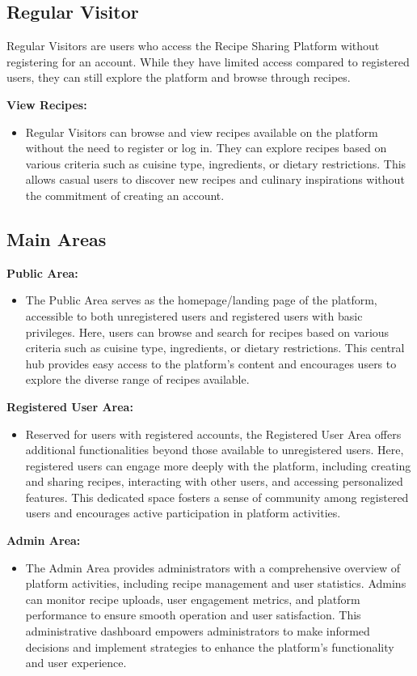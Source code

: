 \subsection{Regular Visitor}

Regular Visitors are users who access the Recipe Sharing Platform without registering for an account. While they have limited access compared to registered users, they can still explore the platform and browse through recipes.

\textbf{View Recipes:}
\begin{itemize}
  \item Regular Visitors can browse and view recipes available on the platform without the need to register or log in. They can explore recipes based on various criteria such as cuisine type, ingredients, or dietary restrictions. This allows casual users to discover new recipes and culinary inspirations without the commitment of creating an account.
\end{itemize}

\subsection{Main Areas}

\textbf{Public Area:}
\begin{itemize}
  \item The Public Area serves as the homepage/landing page of the platform, accessible to both unregistered users and registered users with basic privileges. Here, users can browse and search for recipes based on various criteria such as cuisine type, ingredients, or dietary restrictions. This central hub provides easy access to the platform's content and encourages users to explore the diverse range of recipes available.
\end{itemize}

\textbf{Registered User Area:}
\begin{itemize}
  \item Reserved for users with registered accounts, the Registered User Area offers additional functionalities beyond those available to unregistered users. Here, registered users can engage more deeply with the platform, including creating and sharing recipes, interacting with other users, and accessing personalized features. This dedicated space fosters a sense of community among registered users and encourages active participation in platform activities.

\end{itemize}

\textbf{Admin Area:}
\begin{itemize}
  \item The Admin Area provides administrators with a comprehensive overview of platform activities, including recipe management and user statistics. Admins can monitor recipe uploads, user engagement metrics, and platform performance to ensure smooth operation and user satisfaction. This administrative dashboard empowers administrators to make informed decisions and implement strategies to enhance the platform's functionality and user experience.
\end{itemize}


